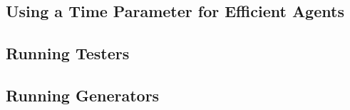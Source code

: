 \subsection{Using a Time Parameter for Efficient Agents}

\subsection{Running Testers}

\subsection{Running Generators}
